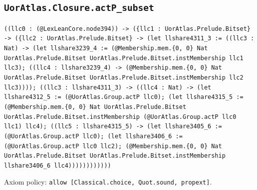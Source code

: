 \documentclass[11pt]{article}
\begin{document}
\subsection*{\texttt{UorAtlas.Closure.actP\_subset}}
\noindent\texttt{((llc0 : (@LexLeanCore.node394)) -> (\{llc1 : UorAtlas.Prelude.Bitset\} -> (\{llc2 : UorAtlas.Prelude.Bitset\} -> (let llshare4311\_3 := ((llc3 : Nat) -> (let llshare3239\_4 := (@Membership.mem.\{0, 0\} Nat UorAtlas.Prelude.Bitset UorAtlas.Prelude.Bitset.instMembership llc1 llc3); ((llc4 : llshare3239\_4) -> (@Membership.mem.\{0, 0\} Nat UorAtlas.Prelude.Bitset UorAtlas.Prelude.Bitset.instMembership llc2 llc3)))); ((llc3 : llshare4311\_3) -> ((llc4 : Nat) -> (let llshare4312\_5 := (@UorAtlas.Group.actP llc0); (let llshare4315\_5 := (@Membership.mem.\{0, 0\} Nat UorAtlas.Prelude.Bitset UorAtlas.Prelude.Bitset.instMembership (@UorAtlas.Group.actP llc0 llc1) llc4); ((llc5 : llshare4315\_5) -> (let llshare3405\_6 := (@UorAtlas.Group.actP llc0); (let llshare3406\_6 := (@UorAtlas.Group.actP llc0 llc2); (@Membership.mem.\{0, 0\} Nat UorAtlas.Prelude.Bitset UorAtlas.Prelude.Bitset.instMembership llshare3406\_6 llc4))))))))))))}\par
\noindent Axiom policy: \texttt{allow [Classical.choice, Quot.sound, propext]}.\par
\end{document}
